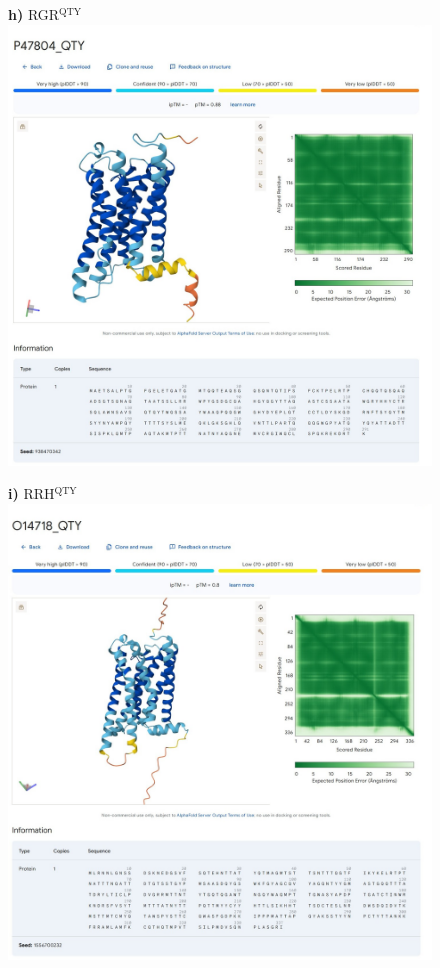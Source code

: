 \documentclass[fleqn,12pt]{supp}
\begin{document}
\newpage
\begin{figure}[H]
    \textbf{h)} RGR$^{\textrm{QTY}}$ \\
    \includegraphics[width=\linewidth]{FigureS2h.jpg}
\end{figure}

\newpage
\begin{figure}[H]
    \textbf{i)} RRH$^{\textrm{QTY}}$ \\
    \includegraphics[width=\linewidth]{FigureS2i.jpg}
\end{figure}
\end{document}
